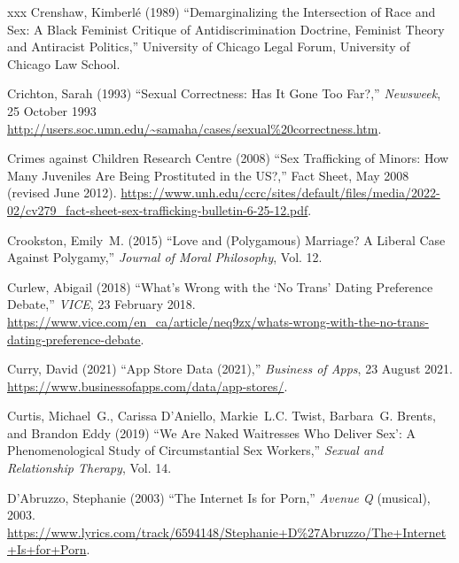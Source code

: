 \documentclass[]{jlreq} \usepackage{mystyle}
\begin{document}
\begin{thebibliography}{xxx}
Crenshaw, Kimberlé (1989) ``Demarginalizing the Intersection of Race and Sex:
  A Black Feminist Critique of Antidiscrimination Doctrine, Feminist Theory and
  Antiracist Politics,'' University of Chicago Legal Forum, University of
  Chicago Law School.

Crichton, Sarah (1993) ``Sexual Correctness: Has It Gone Too Far?,''
  \emph{Newsweek}, 25 October 1993
  \url{http://users.soc.umn.edu/~samaha/cases/sexual%20correctness.htm}.

{Crimes against Children Research Centre} (2008) ``Sex Trafficking of Minors:
  How Many Juveniles Are Being Prostituted in the US?,'' Fact Sheet, May 2008
  (revised June 2012).
  \url{https://www.unh.edu/ccrc/sites/default/files/media/2022-02/cv279_fact-sheet-sex-trafficking-bulletin-6-25-12.pdf}.

Crookston, Emily~M. (2015) ``Love and (Polygamous) Marriage? A Liberal Case
  Against Polygamy,'' \textit{ Journal of Moral Philosophy}, Vol. 12.

Curlew, Abigail (2018) ``What's Wrong with the `No Trans' Dating Preference
  Debate,'' \emph{VICE}, 23 February 2018.
  \url{https://www.vice.com/en_ca/article/neq9zx/whats-wrong-with-the-no-trans-dating-preference-debate}.

Curry, David (2021) ``App Store Data (2021),'' \emph{Business of Apps}, 23
  August 2021. \url{https://www.businessofapps.com/data/app-stores/}.

Curtis, Michael~G., Carissa D'Aniello, Markie~L.C. Twist, Barbara~G. Brents,
  and Brandon Eddy (2019) ``We Are Naked Waitresses Who Deliver Sex': A
  Phenomenological Study of Circumstantial Sex Workers,'' \textit{ Sexual and
  Relationship Therapy}, Vol. 14.

D'Abruzzo, Stephanie (2003) ``The Internet Is for Porn,'' \emph{Avenue Q}
  (musical), 2003.
  \url{https://www.lyrics.com/track/6594148/Stephanie+D\%27Abruzzo/The+Internet+Is+for+Porn}.


\end{thebibliography}
\end{document}
